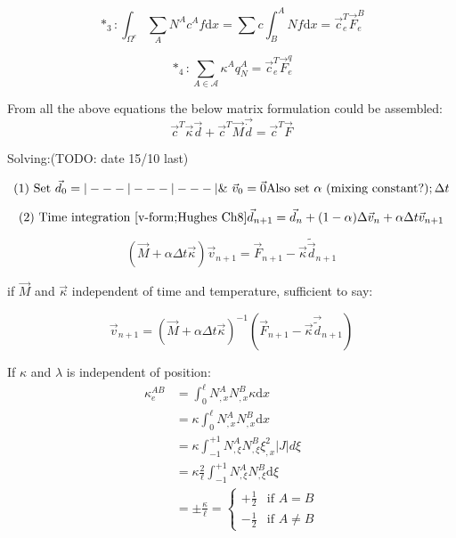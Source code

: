 \begin{equation*}
*_3: \int_{\Omega^e} \sum_A N^A c^A f \text{d}x = \sum c \int_B^A N f \text{d}x = \vec{c}_e^T \vec{F}_e^B
\end{equation*}


\begin{equation*}
*_4: \sum_{A \in \mathcal{A}} \kappa^A q_N^A = \vec{c}_e^T \vec{F}_e^q
\end{equation*}


From all the above equations the below matrix formulation could be assembled:
\begin{equation}\label{femdiffeq7}
\vec{c}^T \vec{\kappa} \vec{d} + \vec{c}^T \vec{M} \vec{\dot{d}} = \vec{c}^T \vec{F}
\end{equation}


Solving:(TODO: date 15/10 last)

\begin{equation}
(1) \text{ Set } \vec{d}_0 = |---|---|---| \\
\&\ \vec{v}_0 = \vec{0} \\
\text{Also set } \alpha \text{ (mixing constant?)} ; \Delta t
\end{equation}


\begin{equation}
(2) \text{ Time integration [v-form;Hughes Ch8]} \\
\vec{d}_{n+1} = \vec{d}_n + (1-\alpha) \Delta \vec{v}_n + \alpha \Delta t \vec{v}_{n+1}
\end{equation}


\begin{equation}
(\vec{M} + \alpha\Delta t \vec{\kappa})\vec{v}_{n+1} = \vec{F}_{n+1} - \vec{\kappa} \tilde{\vec{d}}_{n+1}
\end{equation}


if $\vec{M}$ and $\vec{\kappa}$ independent of time and temperature, sufficient to say:

\begin{equation}
\vec{v}_{n+1} = (\vec{M}+\alpha\Delta t \vec{\kappa})^{-1} (\vec{F}_{n+1} - \vec{\kappa} \vec{\tilde{d}}_{n+1})
\end{equation}

If $\kappa$ and $\lambda$ is independent of position:
\begin{equation}
\begin{aligned}
	\kappa_e^{AB} &= \int_0^\ell N_{,x}^A N_{,x}^B \kappa \text{d}x \\
&= \kappa \int_0^\ell N_{,x}^A N_{,x}^B \text{d}x \\
&= \kappa \int_{-1}^{+1} N_{,\xi}^A N_{,\xi}^B \xi_{,x}^2 \left|J\right|  d\xi \\
&=\kappa \frac{2}{\ell} \int_{-1}^{+1} N_{,\xi}^A N_{,\xi}^B \text{d}\xi\\
&= \pm \frac{\kappa}{\ell} = \begin{cases}
+\frac{1}{2} & \text{if } A = B \\
-\frac{1}{2} & \text{if } A \ne B
\end{cases}
\end{aligned}
\end{equation}

